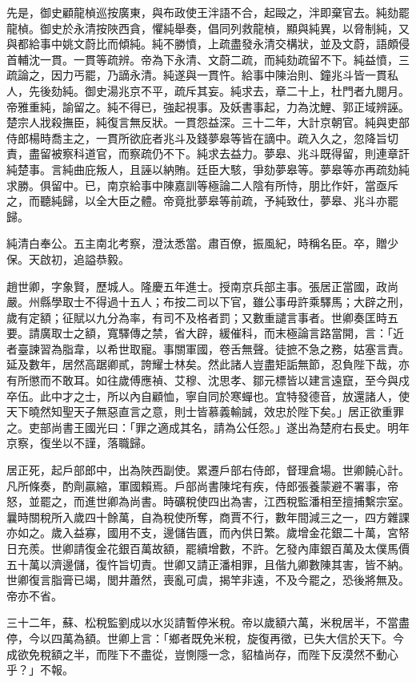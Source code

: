\begin{pinyinscope}
先是，御史顧龍楨巡按廣東，與布政使王泮語不合，起毆之，泮即棄官去。純劾罷龍楨。御史於永清按陜西貪，懼純舉奏，倡同列救龍楨，顯與純異，以脅制純，又與都給事中姚文蔚比而傾純。純不勝憤，上疏盡發永清交構狀，並及文蔚，語頗侵首輔沈一貫。一貫等疏辨。帝為下永清、文蔚二疏，而純劾疏留不下。純益憤，三疏論之，因力丐罷，乃謫永清。純遂與一貫忤。給事中陳治則、鐘兆斗皆一貫私人，先後劾純。御史湯兆京不平，疏斥其妄。純求去，章二十上，杜門者九閱月。帝雅重純，諭留之。純不得已，強起視事。及妖書事起，力為沈鯉、郭正域辨誣。楚宗人戕殺撫臣，純復言無反狀。一貫怨益深。三十二年，大計京朝官。純與吏部侍郎楊時喬主之，一貫所欲庇者兆斗及錢夢皋等皆在謫中。疏入久之，忽降旨切責，盡留被察科道官，而察疏仍不下。純求去益力。夢皋、兆斗既得留，則連章訐純楚事。言純曲庇叛人，且誣以納賄。廷臣大駭，爭劾夢皋等。夢皋等亦再疏劾純求勝。俱留中。已，南京給事中陳嘉訓等極論二人陰有所恃，朋比作奸，當亟斥之，而聽純歸，以全大臣之體。帝竟批夢皋等前疏，予純致仕，夢皋、兆斗亦罷歸。

純清白奉公。五主南北考察，澄汰悉當。肅百僚，振風紀，時稱名臣。卒，贈少保。天啟初，追謚恭毅。

趙世卿，字象賢，歷城人。隆慶五年進士。授南京兵部主事。張居正當國，政尚嚴。州縣學取士不得過十五人；布按二司以下官，雖公事毋許乘驛馬；大辟之刑，歲有定額；征賦以九分為率，有司不及格者罰；又數重譴言事者。世卿奏匡時五要。請廣取士之額，寬驛傳之禁，省大辟，緩催科，而末極論言路當開，言：「近者臺諫習為脂韋，以希世取寵。事關軍國，卷舌無聲。徒摭不急之務，姑塞言責。延及數年，居然高踞卿貳，誇耀士林矣。然此諸人豈盡矩詬無節，忍負陛下哉，亦有所懲而不敢耳。如往歲傅應禎、艾穆、沈思孝、鄒元標皆以建言遠竄，至今與戍卒伍。此中才之士，所以內自顧恤，寧自同於寒蟬也。宜特發德音，放還諸人，使天下曉然知聖天子無惡直言之意，則士皆慕義輸誠，效忠於陛下矣。」居正欲重罪之。吏部尚書王國光曰：「罪之適成其名，請為公任怨。」遂出為楚府右長史。明年京察，復坐以不謹，落職歸。

居正死，起戶部郎中，出為陜西副使。累遷戶部右侍郎，督理倉場。世卿饒心計。凡所條奏，酌劑贏縮，軍國賴焉。戶部尚書陳垞有疾，侍郎張養蒙避不署事，帝怒，並罷之，而進世卿為尚書。時礦稅使四出為害，江西稅監潘相至擅捕繫宗室。曩時關稅所入歲四十餘萬，自為稅使所奪，商賈不行，數年間減三之一，四方雜課亦如之。歲入益寡，國用不支，邊儲告匱，而內供日繁。歲增金花銀二十萬，宮帑日充羨。世卿請復金花銀百萬故額，罷續增數，不許。乞發內庫銀百萬及太僕馬價五十萬以濟邊儲，復忤旨切責。世卿又請正潘相罪，且偕九卿數陳其害，皆不納。世卿復言脂膏已竭，閭井蕭然，喪亂可虞，揭竿非遠，不及今罷之，恐後將無及。帝亦不省。

三十二年，蘇、松稅監劉成以水災請暫停米稅。帝以歲額六萬，米稅居半，不當盡停，今以四萬為額。世卿上言：「鄉者既免米稅，旋復再徵，已失大信於天下。今成欲免稅額之半，而陛下不盡從，豈惻隱一念，貂榼尚存，而陛下反漠然不動心乎？」不報。


\end{pinyinscope}
